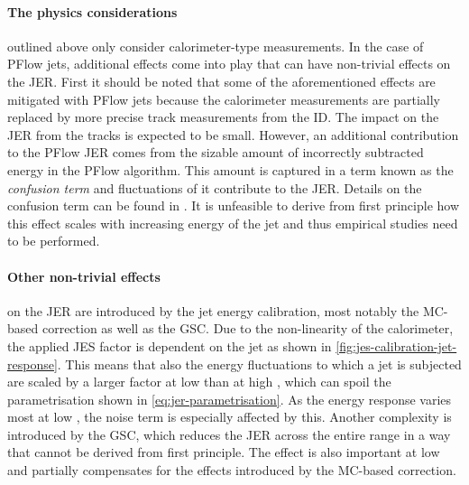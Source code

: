 \paragraph{The physics considerations} outlined above only consider calorimeter-type measurements.
In the case of PFlow jets, additional effects come into play that can have non-trivial effects on the JER.
First it should be noted that some of the aforementioned effects are mitigated with PFlow jets because the calorimeter measurements are partially replaced by more precise track measurements from the ID. 
The impact on the JER from the tracks is expected to be small.
However, an additional contribution to the PFlow JER comes from the sizable amount of incorrectly subtracted energy in the PFlow algorithm.
This amount is captured in a term known as the \emph{confusion term} and fluctuations of it contribute to the JER. Details on the confusion term can be found in . It is unfeasible to derive from first principle how this effect scales with increasing energy of the jet and thus empirical studies need to be performed.

\paragraph{Other non-trivial effects} on the JER are introduced by the jet energy calibration, most notably the MC-based correction as well as the GSC.
Due to the non-linearity of the calorimeter, the applied JES factor is dependent on the jet \pT as shown in \cref{fig:jes-calibration-jet-response}. This means that also the energy fluctuations to which a jet is subjected are scaled by a larger factor at low \pT than at high \pT, which can spoil the parametrisation shown in \cref{eq:jer-parametrisation}.
As the energy response varies most at low \pT, the noise term is especially affected by this.
Another complexity is introduced by the GSC, which reduces the JER across the entire \pT range in a way that cannot be derived from first principle. The effect is also important at low \pT and partially compensates for the effects introduced by the MC-based correction.


